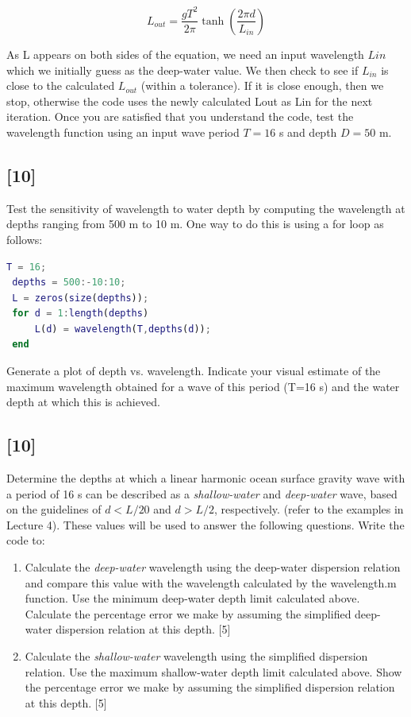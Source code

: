 \documentclass[a4paper,english]{scrartcl}
\begin{document}
\[
L_{out} = \frac{g T^2}{2\pi} \tanh \left(\frac{2\pi d}{L_{in}}\right)
\]

As L appears on both sides of the equation, we need an input wavelength \(L{in}\) which we initially guess as the deep-water value. We then check to see if \(L_{in}\) is close to the calculated \(L_{out}\) (within a tolerance). If it is close enough, then we stop, otherwise the code uses the newly calculated Lout as Lin for the next iteration. Once you are satisfied that you understand the code, test the wavelength function using an input wave period $T = 16$ s and depth $D = 50$ m.


\subsection{[10]}

Test the sensitivity of wavelength to water depth by computing the wavelength at depths ranging from 500 m to 10 m. One way to do this is using a for loop as follows:

\begin{lstlisting}[language=Matlab,basicstyle={\small},showstringspaces=false,frame=lines]
 T = 16;
 depths = 500:-10:10;
 L = zeros(size(depths));
 for d = 1:length(depths)
     L(d) = wavelength(T,depths(d));
 end
\end{lstlisting}

Generate a plot of depth vs. wavelength. Indicate your visual estimate of the maximum wavelength obtained for a wave of this period (T=16 s) and the water depth at which this is achieved.

\subsection{[10]}

Determine the depths at which a linear harmonic ocean surface gravity wave with a period of 16 s can be described as a \textit{shallow-water} and \textit{deep-water} wave, based on the guidelines of $d<L/20$ and $d>L/2$, respectively. (refer to the examples in Lecture 4).
These values will be used to answer the following questions. Write the code to: 
 \begin{enumerate}
     \item  Calculate the \textit{deep-water} wavelength using the deep-water dispersion relation and compare this value with the wavelength calculated by the wavelength.m function. Use the minimum deep-water depth limit calculated above. Calculate the percentage error we make by assuming the simplified deep-water dispersion relation at this depth. [5]
     \item Calculate the \textit{shallow-water} wavelength using the simplified dispersion relation. Use the maximum shallow-water depth limit calculated above. Show the percentage error we make by assuming the simplified dispersion relation at this depth. [5] 
 \end{enumerate}
\end{document}
